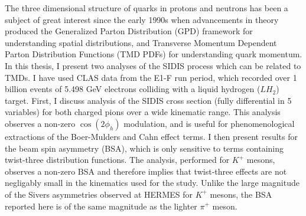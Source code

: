 The three dimensional structure of quarks in protons and neutrons has been a subject of great interest since the early 1990s when advancements in theory produced the Generalized Parton Distribution (GPD) framework for understanding spatial distributions, and Transverse Momentum Dependent Parton Distribution Functions (TMD PDFs) for understanding quark momentum.  In this thesis, I present two analyses of the SIDIS process which can be related to TMDs.  I have used CLAS data from the E1-F run period, which recorded over 1 billion events of 5.498 GeV electrons colliding with a liquid hydrogen ($LH_2$) target.  First, I discuss analysis of the SIDIS cross section (fully differential in 5 variables) for both charged pions over a wide kinematic range.  This analysis observes a non-zero $\cos(2\phi_h)$ modulation, and is useful for phenomenological extractions of the Boer-Mulders and Cahn effect terms.  I then present results for the beam spin asymmetry (BSA), which is only sensitive to terms containing twist-three distribution functions.  The analysis, performed for $K^+$ mesons, observes a non-zero BSA and therefore implies that twist-three effects are not negligably small in the kinematics used for the study.  Unlike the large magnitude of the Sivers asymmetries observed at HERMES for $K^+$ mesons, the BSA reported here is of the same magnitude as the lighter $\pi^+$ meson. 
